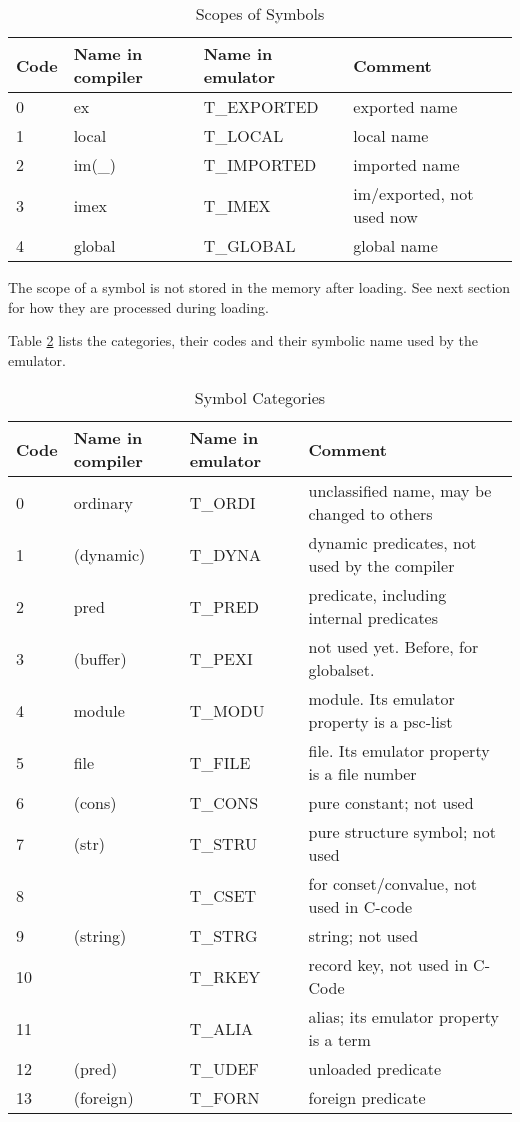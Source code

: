 \documentclass[11pt]{article}
\begin{document}
\begin{table}\centering
\begin{tabular}{l|l|l|l}
\hline
Code & Name in compiler & Name in emulator & Comment		\\
\hline
   0 & ex	& T\_EXPORTED	& exported name			\\
   1 & local	& T\_LOCAL	& local name			\\
   2 & im(\_)	& T\_IMPORTED	& imported name			\\
   3 & imex	& T\_IMEX	& im/exported, not used now	\\
   4 & global	& T\_GLOBAL	& global name			\\
\hline
\end{tabular}
\caption{Scopes of Symbols}
\label{t:symscope}
\end{table}

The scope of a symbol is not stored in the memory after loading. See next
section for how they are processed during loading.

Table \ref{t:symcat} lists the categories, their codes and their symbolic
name used by the emulator.

\begin{table}\centering
\begin{tabular}{l|l|l|l}
\hline
Code & Name in compiler & Name in emulator & Comment		\\
\hline
  0 & ordinary	& T\_ORDI & unclassified name, may be changed to others \\
  1 & (dynamic)	& T\_DYNA & dynamic predicates, not used by the compiler \\
  2 & pred	& T\_PRED & predicate, including internal predicates	\\
  3 & (buffer)	& T\_PEXI & not used yet. Before, for globalset.	\\
  4 & module	& T\_MODU & module. Its emulator property is a psc-list \\
  5 & file	& T\_FILE & file. Its emulator property is a file number \\
  6 & (cons)	& T\_CONS & pure constant; not used			\\
  7 & (str)	& T\_STRU & pure structure symbol; not used		\\
  8 &		& T\_CSET & for conset/convalue, not used in C-code	\\
  9 & (string)	& T\_STRG & string; not used				\\
 10 &		& T\_RKEY & record key, not used in C-Code		\\
 11 &		& T\_ALIA & alias; its emulator property is a term	\\
 12 & (pred)	& T\_UDEF & unloaded predicate				\\
 13 & (foreign)	& T\_FORN & foreign predicate				\\
\hline
\end{tabular}
\caption{Symbol Categories}
\label{t:symcat}
\end{table}
\end{document}
